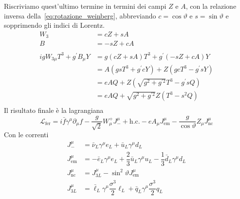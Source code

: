 \documentclass[italian,a4paper]{article}
\theoremstyle{definition}
\newcommand{\lagrfer}{\ensuremath{\mathscr{L}_{\text{fer}}}}
\newcommand{\dimu}{\ensuremath{\partial_{\mu}}}
\renewcommand{\theta}{\vartheta}
\begin{document}
Riscriviamo quest'ultimo termine in termini dei campi $Z$ e $A$, con la
relazione inversa della~\eqref{eq:rotazione_weinberg}, abbreviando
$c = \cos \theta$ e $s = \sin \theta$ e sopprimendo gli indici di
Lorentz.
\begin{align*}
    W_3 &= cZ + sA\\
    B &= -sZ + cA\\
    \\
    i g W_{3\mu}T^3 + g^{\prime} B_\mu Y &= 
    g (cZ + sA) T^3 +
    g^{\prime}(-sZ + cA) Y\\
    &= 
    A (gsT^3 + g^{\prime}c Y) +
    Z (gcT^3 - g^{\prime}s Y)\\
    &= 
    eAQ + 
    Z(\sqrt{g^2 + g^{\prime 2}} T^3 - g^{\prime}s Q)\\
    &= 
    eAQ + 
    \sqrt{g^2 + g^{\prime 2}} Z(T^3 - s^2 Q)\\
\end{align*}
Il risultato finale \`e la lagrangiana
\begin{equation*}
    \lagrfer =
    i \bar{f}\gamma^\mu\dimu f -
    \dfrac{g}{\sqrt{2}}W^+_\mu J^{\mu}_- + \text{h.c.} -
    e A_\mu J^{\mu}_{\text{em}}
    - \dfrac{g}{\cos \theta} Z_\mu J^\mu_{\text{nc}}
\end{equation*}
Con le correnti
\begin{align*}
    J^{\mu}_- &= \bar{\nu}_L \gamma^\mu e_L + \bar{u}_L \gamma^\mu d_L \\
    J^{\mu}_{\text{em}} &= -\bar{e}_L \gamma^\mu e_L
    + \dfrac{2}{3}\bar{u}_L \gamma^\mu u_L
    - \dfrac{1}{3}\bar{d}_L \gamma^\mu d_L
    \\
    J^{\mu}_{\text{nc}} &= J^\mu_{3L} - \sin^2 \theta J_{\text{em}}^\mu\\
    J^\mu_{3L} &= \bar{\ell}_L \gamma^\mu \dfrac{\sigma^3}{2}\ell_L +
    \bar{q}_L \gamma^\mu \dfrac{\sigma^3}{2}q_L 
\end{align*}
\end{document}
